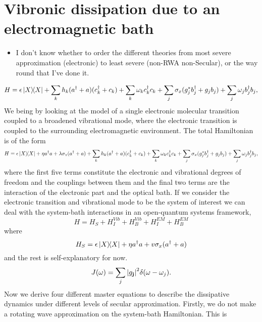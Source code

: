 \documentclass[]{article}
\begin{document}
\section{Vibronic dissipation due to an electromagnetic bath}
\begin{itemize}
	\item I don't know whether to order the different theories from most severe approximation (electronic) to least severe (non-RWA non-Secular), or the way round that I've done it.
\end{itemize}
\begin{equation}
H = \epsilon \dyad{X} + \sum_{k}h_k(a^{\dagger}+a)(c^{\dagger}_k+c_k) + \sum_{k}\omega_k c^{\dagger}_k c_k + \sum_{j}\sigma_x(g^*_jb^{\dagger}_j+g_jb_j) + \sum_{j}\omega_j b^{\dagger}_jb_j,
\end{equation}
We being by looking at the model of a single electronic molecular transition coupled to a broadened vibrational mode, where the electronic transition is coupled to the surrounding electromagnetic environment. The total Hamiltonian is of the form
\begin{equation}
H = \epsilon \dyad{X} + \eta a^{\dagger}a + \lambda\sigma_z(a^{\dagger}+a) + \sum_{k}h_k(a^{\dagger}+a)(c^{\dagger}_k+c_k) + \sum_{k}\omega_k c^{\dagger}_k c_k + \sum_{j}\sigma_x(g^*_jb^{\dagger}_j+g_jb_j) + \sum_{j}\omega_j b^{\dagger}_jb_j,
\end{equation}
where the first five terms constitute the electronic and vibrational degrees of freedom and the couplings between them and the final two terms are the interaction of the electronic part and the optical bath. If we consider the electronic transition and vibrational mode to be the system of interest we can deal with the system-bath interactions in an open-quantum systems framework,
\begin{equation}
H = H_S + H_I^{Vib} + H_B^{Vib} + H_I^{EM}+ H_B^{EM}
\end{equation}
where 
\begin{equation}
H_S = \epsilon \dyad{X} + \eta a^{\dagger}a + v\sigma_x(a^{\dagger}+a)
\end{equation}
and the rest is self-explanatory for now.
\begin{equation}
J (\omega)= \sum_{j}\abs{g_{\textbf{j}}}^2 \delta (\omega-\omega_j).
\end{equation}
Now we derive four different master equations to describe the dissipative dynamics under different levels of secular approximation. Firstly, we do not make a rotating wave approximation on the system-bath Hamiltonian. This is 
\end{document}
